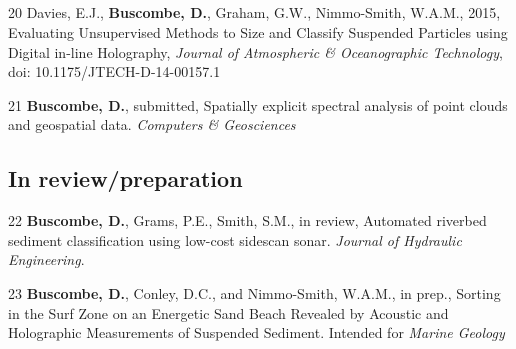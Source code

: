 \documentclass[margin,line]{resume}
\begin{document}
\begin{resume}
\begin{footnotesize}
	\subsection{}
	\begin{list1}
	
	\item[20] Davies, E.J., {\bf Buscombe, D.}, Graham, G.W., Nimmo-Smith, W.A.M., 2015, Evaluating Unsupervised Methods to Size and Classify Suspended Particles using Digital in-line Holography, {\sl Journal of Atmospheric \& Oceanographic Technology}, doi: 10.1175/JTECH-D-14-00157.1 \\

	\item[21] {\bf 	Buscombe, D.}, submitted, Spatially explicit spectral analysis of point clouds and geospatial data. {\sl Computers \& Geosciences}\\

	\end{list1}

	\subsection{\mysidestyle In review/preparation}
	\begin{list1}

	\item[22] {\bf Buscombe, D.}, Grams, P.E., Smith, S.M., in review, Automated riverbed sediment classification using low-cost sidescan sonar. {\sl Journal of Hydraulic Engineering}.\\

	\item[23] {\bf 	Buscombe, D.}, Conley, D.C., and Nimmo-Smith, W.A.M., in prep., Sorting in the Surf Zone on an Energetic Sand Beach Revealed by Acoustic and Holographic Measurements of Suspended Sediment. Intended for {\sl Marine Geology}\\


	



\end{list1}
\end{footnotesize}
\end{resume}
\end{document}
